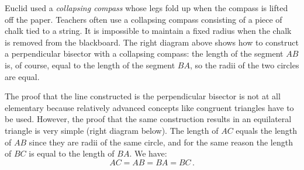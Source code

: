\vspace{-3ex}

Euclid used a \emph{collapsing compass} whose legs fold up when the compass is lifted off the paper. Teachers often use a collapsing compass consisting of a piece of chalk tied to a string. It is impossible to maintain a fixed radius when the chalk is removed from the blackboard. The right diagram above shows how to construct a perpendicular bisector with a collapsing compass: the length of the segment $AB$ is, of course, equal to the length of the segment $BA$, so the radii of the two circles are equal.

The proof that the line constructed is the perpendicular bisector is not at all elementary because relatively advanced concepts like congruent triangles have to be used. However, the proof that the same construction results in an equilateral triangle is very simple (right diagram below). The length of $AC$ equals the length of $AB$ since they are radii of the same circle, and for the same reason the length of $BC$ is equal to the length of $BA$. We have:
\[
AC=AB=BA=BC\,.
\]

\begin{center}
\end{center}

